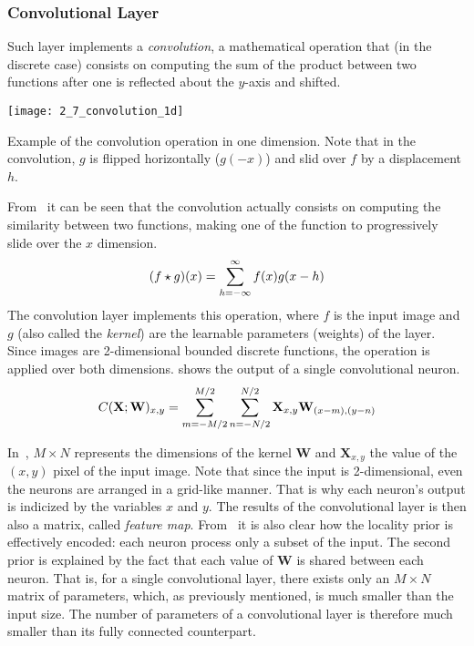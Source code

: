 \subsubsection{Convolutional Layer}
Such layer implements a \emph{convolution}, a mathematical operation that (in
the discrete case) consists on computing the sum of the product between two
functions after one is reflected about the $y$-axis and shifted.
\begin{marginfigure}[*-4]
    \texttt{[image: 2\_7\_convolution\_1d]}
    \caption[Convolution (Mathematical Operation) in 1D]{
    Example of the convolution operation in one dimension. Note that in the
    convolution, $g$ is flipped horizontally ($g(-x)$) and slid over $f$ by a
    displacement $h$.
    }
\end{marginfigure}
From~ it can be seen that the convolution actually consists on
computing the similarity between two functions, making one of the function to
progressively slide over the $x$ dimension.
\begin{equation}
    \labeq{2_18}
    (f \star g)(x) = \sum^\infty_{h=-\infty} f(x)g(x - h) 
\end{equation}
The convolution layer implements this operation, where $f$ is the input image
and $g$ (also called the \emph{kernel}) are the learnable parameters (weights)
of the layer. Since images are 2-dimensional bounded discrete
functions, the operation is applied over both
dimensions.  shows the output of a single convolutional
neuron. 
\begin{equation}
    \labeq{2_19}
    C(\mathbf{X}; \mathbf{W})_{x, y} = \sum^{M/2}_{m=-M/2}\sum^{N/2}_{n=-N/2}
    \mathbf{X}_{x, y}\mathbf{W}_{(x - m), (y - n)} 
\end{equation}

In~, $M \times N$ represents the dimensions of the
kernel $\mathbf{W}$ and $\mathbf{X}_{x, y}$ the value of the $(x, y)$ pixel of
the input image. Note that since the input is 2-dimensional, even the neurons
are arranged in a grid-like manner. That is why each neuron's output is
indicized by the variables $x$ and $y$. The results of the convolutional layer
is then also a matrix, called \emph{feature map}. From~ it is also
clear how the locality prior is effectively encoded: each neuron process only a
subset of the input. The second prior is explained by
the fact that each value of $\mathbf{W}$ is shared between each neuron. That is,
for a single convolutional layer, there exists only an $M \times
N$ matrix of parameters, which, as previously mentioned, is
much smaller than the input size. The number of parameters of a convolutional
layer is therefore much smaller than its fully connected counterpart.

